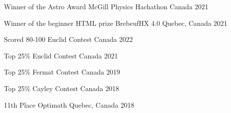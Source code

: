 



\begin{cvhonors}

  \cvhonor
    {Winner of the Astro Award} %
    {McGill Physics Hachathon} %
    {Canada} %
    {2021} %

  \cvhonor
    {Winner of the beginner HTML prize} %
    {BrebeufHX 4.0} %
    {Quebec, Canada} %
    {2021} %

\end{cvhonors}




\begin{cvhonors}

  \cvhonor
    {Scored 80-100} %
    {Euclid Contest} %
    {Canada} %
    {2022} %
    
  \cvhonor
    {Top 25\%} %
    {Euclid Contest} %
    {Canada} %
    {2021} %
    
  \cvhonor
    {Top 25\%} %
    {Fermat Contest} %
    {Canada} %
    {2019} %

  \cvhonor
    {Top 25\%} %
    {Cayley Contest} %
    {Canada} %
    {2018} %

  \cvhonor
    {11th Place} %
    {Optimath} %
    {Quebec, Canada} %
    {2018} %


\end{cvhonors}
